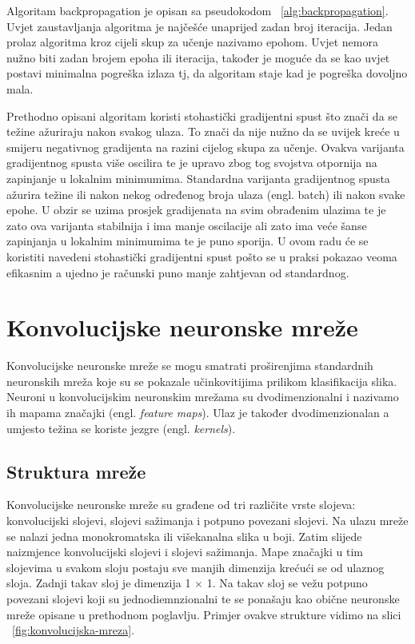 \documentclass[times, utf8, zavrsni, numeric]{fer}
\begin{document}
Algoritam backpropagation je opisan sa pseudokodom ~\ref{alg:backpropagation}. Uvjet zaustavljanja algoritma je najčešće unaprijed zadan broj iteracija. Jedan prolaz algoritma kroz cijeli skup za učenje nazivamo epohom. Uvjet nemora nužno biti zadan brojem epoha ili iteracija, također je moguće da se kao uvjet postavi minimalna pogreška izlaza tj, da algoritam staje kad je pogreška dovoljno mala.

Prethodno opisani algoritam koristi stohastički gradijentni spust što znači da se težine ažuriraju nakon svakog ulaza. To znači da nije nužno da se uvijek kreće u smijeru negativnog gradijenta na razini cijelog skupa za učenje. Ovakva varijanta gradijentnog spusta više oscilira te je upravo zbog tog svojstva otpornija na zapinjanje u lokalnim minimumima. Standardna varijanta gradijentnog spusta ažurira težine ili nakon nekog određenog broja ulaza (engl. batch) ili nakon svake epohe. U obzir se uzima prosjek gradijenata na svim obrađenim ulazima te je zato ova varijanta stabilnija i ima manje oscilacije ali zato ima veće šanse zapinjanja u lokalnim minimumima te je puno sporija. U ovom radu će se koristiti navedeni stohastički gradijentni spust pošto se u praksi pokazao veoma efikasnim a ujedno je računski puno manje zahtjevan od standardnog.

\chapter{Konvolucijske neuronske mreže}
Konvolucijske neuronske mreže se mogu smatrati proširenjima standardnih neuronskih mreža koje su se pokazale učinkovitijima prilikom klasifikacija slika. Neuroni u konvolucijskim neuronskim mrežama su dvodimenzionalni i nazivamo ih mapama značajki (engl. \textit{feature maps}). Ulaz je također dvodimenzionalan a umjesto težina se koriste jezgre (engl. \textit{kernels}).

\section{Struktura mreže}
Konvolucijske neuronske mreže su građene od tri različite vrste slojeva: konvolucijski slojevi, slojevi sažimanja i potpuno povezani slojevi. Na ulazu mreže se nalazi jedna monokromatska ili višekanalna slika u boji. Zatim slijede naizmjence konvolucijski slojevi i slojevi sažimanja. Mape značajki u tim slojevima u svakom sloju postaju sve manjih dimenzija krećući se od ulaznog sloja. Zadnji takav sloj je dimenzija 1 $\times$ 1. Na takav sloj se vežu potpuno povezani slojevi koji su jednodiemnzionalni te se ponašaju kao obične neuronske mreže opisane u prethodnom poglavlju. Primjer ovakve strukture vidimo na slici ~\ref{fig:konvolucijska-mreza}.
\end{document}
